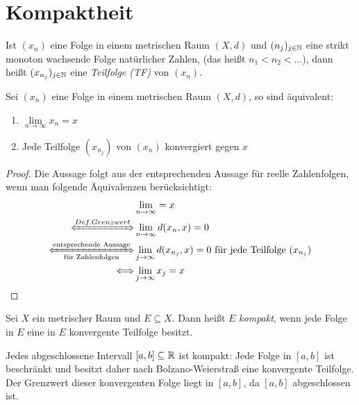 \cleardoublepage
\section{Kompaktheit}

\begin{Definition}%
	Ist $(x_n)$ eine Folge in einem metrischen Raum $(X,d)$ und $(n_j)_{j \in \mathbb{N}}$ 
	eine strikt monoton wachsende Folge natürlicher Zahlen, (das heißt \mbox{$n_1 < n_2 
	< \hdots$}), dann heißt $(x_{n_j})_{j \in \mathbb{N}}$ eine \emph{Teilfolge (TF)} von 
	$(x_n)$.
\end{Definition}

\begin{Proposition}\label{vl_25_prop_1}%
	Sei $(x_n)$ eine Folge in einem metrischen Raum $(X,d)$, so sind äquivalent:
	\begin{enumerate}
		\item \label{vl_25_stp_1}$\lim\limits_{n \rightarrow \infty}{x_n} = x$
		\item \label{vl_25_stp_2} Jede Teilfolge $(x_{n_j})$ von $(x_n)$ 
			konvergiert gegen $x$
	\end{enumerate}
\end{Proposition}

\begin{proof}
	Die Aussage folgt aus der entsprechenden Aussage für reelle Zahlenfolgen, wenn 
	man folgende Äquivalenzen berücksichtigt:
	\begin{align*}
		&\lim\limits_{n \rightarrow \infty} = x \\
		\xLeftrightarrow{Def. Grenzwert} &
			\lim\limits_{n\rightarrow\infty}d(x_n,x)=0 \\
		\xLeftrightarrow[\text{für Zahlenfolgen}]{\text{entsprechende Aussage}} 
			& \lim\limits_{j\rightarrow \infty}d(x_{n_j},x) = 0 
			\text{ für jede Teilfolge } (x_{n_j}) \\
		\Longleftrightarrow & \lim\limits_{j \rightarrow \infty} x_j = x
	\end{align*}
\end{proof}

\begin{Definition}%
	Sei $X$ ein metrischer Raum und $E \subseteq X$. Dann heißt $E$ \emph{kompakt}, 
	wenn jede Folge in $E$ eine in $E$ konvergente Teilfolge besitzt.
\end{Definition}

\begin{Beispiel}	
	Jedes abgeschlossene Intervall $[a,b] \subseteq \mathbb{R}$ ist kompakt: 
	Jede Folge in $[a,b]$ ist beschränkt und besitzt daher nach Bolzano-Weierstraß 
	eine konvergente Teilfolge. Der Grenzwert dieser konvergenten Folge liegt in 
	$[a,b]$, da $[a,b]$ abgeschlossen ist.
\end{Beispiel}
 
